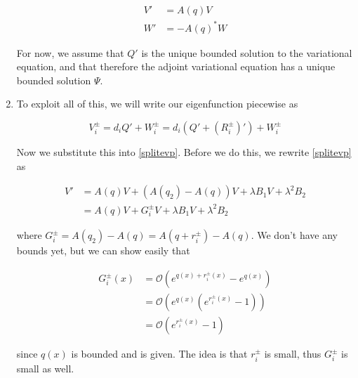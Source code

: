 \documentclass[12pt]{article}
\begin{document}
\begin{enumerate}
\begin{align}
V' &= A(q)V \\
W' &= -A(q)^* W
\end{align}

For now, we assume that $Q'$ is the unique bounded solution to the variational equation, and that therefore the adjoint variational equation has a unique bounded solution $\Psi$.

\item To exploit all of this, we will write our eigenfunction piecewise as

\[
V_i^\pm = d_i Q' + W_i^\pm = d_i(Q' + (R_i^\pm)') + W_i^\pm
\]


Now we substitute this into \eqref{splitevp}. Before we do this, we rewrite \eqref{splitevp} as 

\begin{align*}
V' &= A(q)V + (A(q_2) - A(q))V + \lambda B_1 V + \lambda^2 B_2 \\
&= A(q)V + G_i^\pm V + \lambda B_1 V + \lambda^2 B_2
\end{align*}

where $G_i^\pm = A(q_2) - A(q) = A(q + r_i^\pm) - A(q)$. We don't have any bounds yet, but we can show easily that

\begin{align*}
G_i^\pm(x) &= \mathcal{O}(e^{q(x) + r_i^\pm(x)} - e^{q(x)} )\\
&= \mathcal{O}(e^{q(x)}(e^{r_i^\pm(x)} - 1)) \\
&= \mathcal{O}(e^{r_i^\pm(x)} - 1)
\end{align*}

since $q(x)$ is bounded and is given. The idea is that $r_i^\pm$ is small, thus $G_i^\pm$ is small as well.

 





\end{enumerate}
\end{document}
